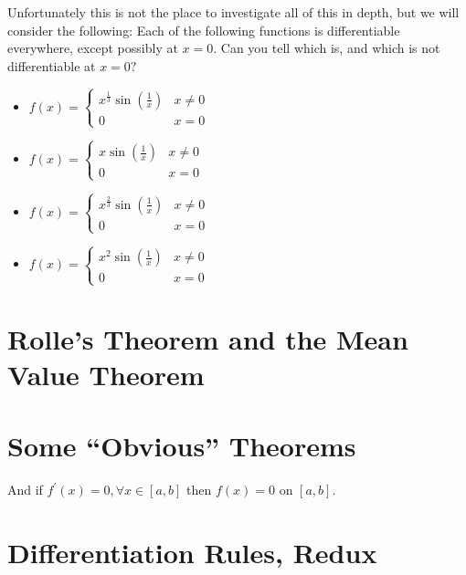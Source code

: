Unfortunately this is not the place to investigate all of this in
depth, but we will consider the following: Each of the following
functions is differentiable everywhere, except possibly at $x=0.$ Can
you tell which is, and which is not differentiable at $x=0?$
\begin{itemize}
\item $f(x) =
  \begin{cases}
    x^{\frac13}\sin\left(\frac1x\right)& x\neq0\\
    0                                & x=0 
  \end{cases}$
\item $f(x) =
  \begin{cases}
    x\sin\left(\frac1x\right)& x\neq0\\
    0                                & x=0 
  \end{cases}$
\item $f(x) =
  \begin{cases}
    x^{\frac23}\sin\left(\frac1x\right)& x\neq0\\
    0                                & x=0 
  \end{cases}$
\item $f(x) =
  \begin{cases}
    x^2\sin\left(\frac1x\right)& x\neq0\\
    0                                & x=0 
  \end{cases}$
\end{itemize}
\endaptta{}
\section{Rolle's Theorem and the Mean Value Theorem}
\label{sec:rolles-theorem-mean}
\aptta{}
\endaptta{}
\section{Some ``Obvious'' Theorems}
\label{sec:some-obvi-theor}
\aptta{}
\endaptta{}


And if $f^\prime(x) = 0, \forall x\in[a,b]$ then $f(x) =0$ on $[a,b].$
\section{Differentiation Rules, Redux}
\label{sec:diff-rules-redux}
\aptta{}

